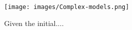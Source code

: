 \begin{figure}[t]
\centering
  \texttt{[image: images/Complex-models.png]}
\caption{Given the initial....}
  \label{fig:Complex-models}    
\end{figure}